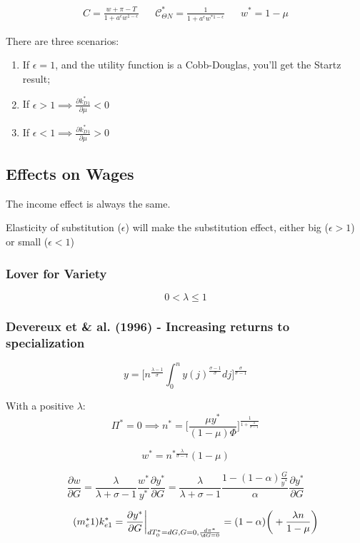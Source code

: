 \begin{align*}
    C=\frac{w+\pi-T}{1+a^{\epsilon}w^{1-\epsilon}} && \mathcal{C}_{\Theta N}^*=\frac{1}{1+a^\epsilon w^{* 1-\epsilon}} && w^*=1-\mu
\end{align*}

There are three scenarios: 
\begin{enumerate}
    \item If $\epsilon=1$, and the utility function is a Cobb-Douglas, you'll get the Startz result; 
    \item If $\epsilon>1 \implies \frac{\partial k^*_{D1}}{\partial \mu}<0$
    \item If $\epsilon<1 \implies \frac{\partial k^*_{D1}}{\partial \mu}>0$ 
\end{enumerate}

\subsection{Effects on Wages}

The income effect is always the same. 

Elasticity of substitution ($\epsilon$) will make the substitution effect, either big ($\epsilon>1$) or small ($\epsilon<1$)
\subsubsection{Lover for Variety}

$$
0 < \lambda \leq 1
$$
\subsubsection{ Devereux et \& al. (1996) - Increasing returns to specialization}
$$
y = \bigg[ n^{\frac{\lambda-1}{\sigma}} \int_0^n y(j)^\frac{\sigma-1}{\sigma}dj   \bigg]^\frac{\sigma}{\sigma - 1}
$$

With a positive $\lambda$:
$$
\Pi^* = 0 \implies n^*=\bigg[\frac{\mu y^*}{(1-\mu)\Phi}\bigg]^{\frac{1}{1+\frac{\lambda}{\sigma-1}}}
$$

$$
w^*=n^{*\frac{\lambda}{\sigma-1}}(1-\mu)
$$

$$
\frac{\partial w}{\partial G}=\frac{\lambda}{\lambda + \sigma -1}\frac{w^*}{y^*}\frac{\partial y^*}{\partial G}=\frac{\lambda}{\lambda+\sigma-1}\frac{1-(1-\alpha)\frac{G}{y^*}}{\alpha}\frac{\partial y^*}{\partial G}
$$

\begin{equation}\tag{$m^*_e1$}
k^*_{e1}=\frac{\partial y^*}{\partial G}\bigg\rvert_{dT^*_0=dG,G=0,\frac{d \pi^*}{\d G=0}}=(1-\alpha)\bigg(+\frac{\lambda n}{1-\mu} \bigg)
\end{equation}


